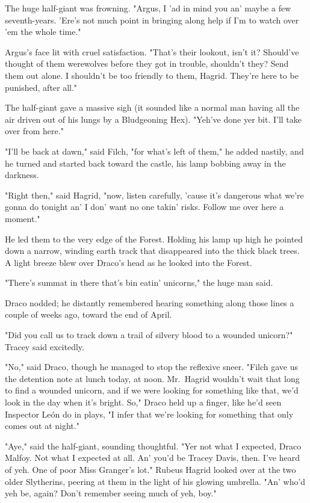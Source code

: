 The huge half-giant was frowning. "Argus, I 'ad in mind you an' maybe a few 
seventh-years. 'Ere's not much point in bringing along help if I'm to watch 
over 'em the whole time."

Argus's face lit with cruel satisfaction. "That's their lookout, isn't it? 
Should've thought of them werewolves before they got in trouble, shouldn't 
they? Send them out alone. I shouldn't be too friendly to them, Hagrid. They're 
here to be punished, after all."

The half-giant gave a massive sigh (it sounded like a normal man having all the 
air driven out of his lungs by a Bludgeoning Hex). "Yeh've done yer bit. I'll 
take over from here."

"I'll be back at dawn," said Filch, "for what's left of them," he added 
nastily, and he turned and started back toward the castle, his lamp bobbing 
away in the darkness.

"Right then," said Hagrid, "now, listen carefully, 'cause it's dangerous what 
we're gonna do tonight an' I don' want no one takin' risks. Follow me over here 
a moment."

He led them to the very edge of the Forest. Holding his lamp up high he pointed 
down a narrow, winding earth track that disappeared into the thick black trees. 
A light breeze blew over Draco's head as he looked into the Forest.

"There's summat in there that's bin eatin' unicorns," the huge man said.

Draco nodded; he distantly remembered hearing something along those lines a 
couple of weeks ago, toward the end of April.

"Did you call us to track down a trail of silvery blood to a wounded unicorn?" 
Tracey said excitedly.

"No," said Draco, though he managed to stop the reflexive sneer. "Filch gave us 
the detention note at lunch today, at noon. Mr.~Hagrid wouldn't wait that long 
to find a wounded unicorn, and if we were looking for something like that, we'd 
look in the day when it's bright. So," Draco held up a finger, like he'd seen 
Inspector León do in plays, "I infer that we're looking for something that only 
comes out at night."

"Aye," said the half-giant, sounding thoughtful. "Yer not what I expected, 
Draco Malfoy. Not what I expected at all. An' you'd be Tracey Davis, then. I've 
heard of yeh. One of poor Miss Granger's lot." Rubeus Hagrid looked over at the 
two older Slytherins, peering at them in the light of his glowing umbrella. 
"An' who'd yeh be, again? Don't remember seeing much of yeh, boy."

